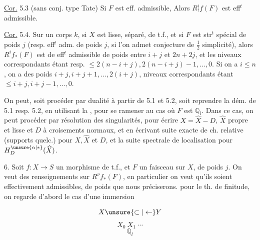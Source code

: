 
\uline{Cor.} 5.3 (sans conj. type Tate)  Si $F$ est eff. admissible, Alors $R^i_!f(F)$ est eff$^{t}$ admissible.

\uline{Cor.} 5.4. Sur un corps $k$, si $X$ est lisse, séparé, de t.f., et si $F$ est  str$^{t}$ spécial de poids $j$ (resp. eff$^{t}$ adm. de poids $j$, si l'on admet conjecture de $\frac12$ simplicité), alors $R^if_*(F)$ est de eff$^{t}$ admissible de poids entre $i+j$ et $2n+2j$, et les niveaux correspondants étant resp. $\leq2(n-i+j),2(n-i+j)-1,\ldots,0$. Si on a $i\leq n$, on a  des poids  $i+j,i+j+1,\ldots,2(i+j)$,  niveaux correspondants étant $\leq i+j,i+j-1,\ldots,0$.


On peut, soit procéder par dualité à partir de 5.1 et 5.2, soit reprendre  la dém. de 5.1 resp. 5.2, en utilisant la  , pour se ramener au cas où $F$ est $\mathbb Q_l$. Dans ce cas, on peut procéder par  résolution des singularités, pour écrire $X=\widehat X-D$, $\widehat X$  propre et lisse et $D$  à croisements normaux, et en écrivant suite exacte de ch. relative (supports quelc.) pour $X,\widehat X$ et $D$, et la suite spectrale de localisation pour $H^{\unsure{\alpha|*}}_D(\widehat X)$.


6. Soit $f:X\longrightarrow S$ un morphisme de t.f., et $F$ un faisceau  sur $X$, de poids $j$. On veut des renseignements sur  $R^\nu f_*(F)$, en particulier on veut qu'ils soient effectivement admissibles, de poids que nous préciserons.   pour le th. de finitude, on regarde d'abord le cas d'une immersion

\[
X\unsure{\subset|\leftarrow}Y
\]
\[
X_0\ X_1\ \cdots
\]
\[
\mathbb Q_l
\]

